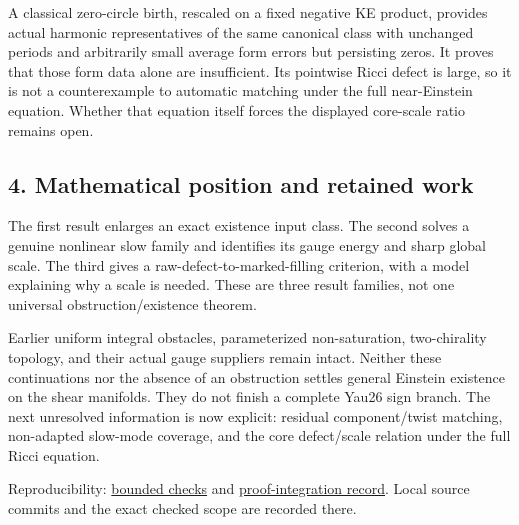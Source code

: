 \documentclass[
  11pt,
]{article}
\begin{document}
A classical zero-circle birth, rescaled on a fixed negative KE product,
provides actual harmonic representatives of the same canonical class
with unchanged periods and arbitrarily small average form errors but
persisting zeros. It proves that those form data alone are insufficient.
Its pointwise Ricci defect is large, so it is not a counterexample to
automatic matching under the full near-Einstein equation. Whether that
equation itself forces the displayed core-scale ratio remains open.

\hypertarget{mathematical-position-and-retained-work}{%
\subsection{4. Mathematical position and retained
work}\label{mathematical-position-and-retained-work}}

The first result enlarges an exact existence input class. The second
solves a genuine nonlinear slow family and identifies its gauge energy
and sharp global scale. The third gives a raw-defect-to-marked-filling
criterion, with a model explaining why a scale is needed. These are
three result families, not one universal obstruction/existence theorem.

Earlier uniform integral obstacles, parameterized non-saturation,
two-chirality topology, and their actual gauge suppliers remain intact.
Neither these continuations nor the absence of an obstruction settles
general Einstein existence on the shear manifolds. They do not finish a
complete Yau26 sign branch. The next unresolved information is now
explicit: residual component/twist matching, non-adapted slow-mode
coverage, and the core defect/scale relation under the full Ricci
equation.

Reproducibility:
\href{../verification/20260924_structure_scales_checks.json}{bounded
checks} and
\href{../verification/20260924_structure_scales_review.md}{proof-integration
record}. Local source commits and the exact checked scope are recorded
there.
\end{document}
